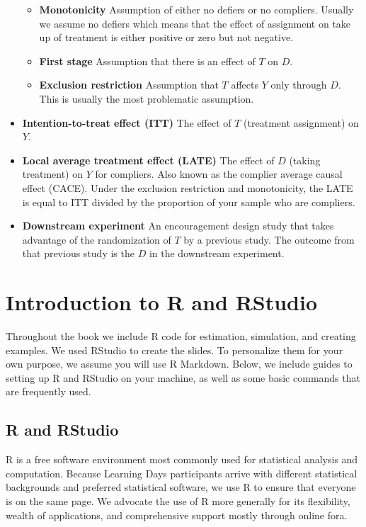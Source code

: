 \documentclass[12pt,]{book}
\providecommand{\tightlist}{%
  \setlength{\itemsep}{0pt}\setlength{\parskip}{0pt}}
\begin{document}
\begin{itemize}
  \begin{itemize}
  \tightlist
  \item
    \textbf{Monotonicity} Assumption of either no defiers or no compliers. Usually we assume no defiers which means that the effect of assignment on take up of treatment is either positive or zero but not negative.
  \item
    \textbf{First stage} Assumption that there is an effect of \(T\) on \(D\).
  \item
    \textbf{Exclusion restriction} Assumption that \(T\) affects \(Y\) only through \(D\). This is usually the most problematic assumption.
  \end{itemize}
\item
  \textbf{Intention-to-treat effect (ITT)} The effect of \(T\) (treatment assignment) on \(Y\).
\item
  \textbf{Local average treatment effect (LATE)} The effect of \(D\) (taking
  treatment) on \(Y\) for compliers. Also known as the complier average causal
  effect (CACE). Under the exclusion restriction and monotonicity, the LATE is
  equal to ITT divided by the proportion of your sample who are compliers.
\item
  \textbf{Downstream experiment} An encouragement design study that takes advantage
  of the randomization of \(T\) by a previous study. The outcome from that
  previous study is the \(D\) in the downstream experiment.
\end{itemize}

\hypertarget{introduction-to-r-and-rstudio}{%
\chapter{Introduction to R and RStudio}\label{introduction-to-r-and-rstudio}}

Throughout the book we include R code for estimation, simulation, and creating examples. We used RStudio to create the slides. To personalize them for your own purpose, we assume you will use R Markdown. Below, we include guides to setting up R and RStudio on your machine, as well as some basic commands that are frequently used.

\hypertarget{r-and-rstudio}{%
\section{R and RStudio}\label{r-and-rstudio}}

R is a free software environment most commonly used for statistical analysis and computation. Because Learning Days participants arrive with different statistical backgrounds and preferred statistical software, we use R to ensure that everyone is on the same page. We advocate the use of R more generally for its flexibility, wealth of applications, and comprehensive support mostly through online fora.
\end{document}
